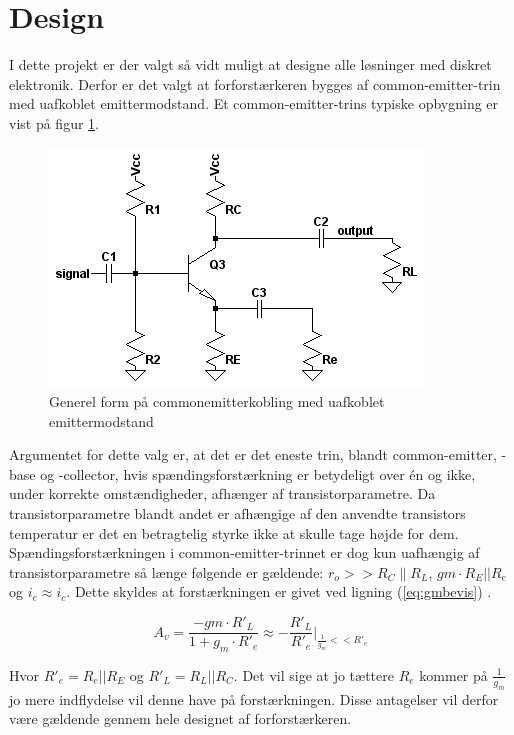 \section{Design}
I dette projekt er der valgt så vidt muligt at designe alle løsninger med diskret elektronik. Derfor er det valgt at forforstærkeren bygges af common-emitter-trin med uafkoblet emittermodstand. Et common-emitter-trins typiske opbygning er vist på figur \ref{fig:cekobling}.

\begin{figure}[h]
\centering
\includegraphics[scale=.6]{teknisk/forforstaerker/ceopkobling.png}
\caption{Generel form på commonemitterkobling med uafkoblet emittermodstand}
\label{fig:cekobling}
\end{figure}


Argumentet for dette valg er, at det er det eneste trin, blandt common-emitter, -base og -collector, hvis spændingsforstærkning er betydeligt over én og ikke, under korrekte omstændigheder, afhænger af transistorparametre. Da transistorparametre blandt andet er afhængige af den anvendte transistors temperatur er det en betragtelig styrke ikke at skulle tage højde for dem. Spændingsforstærkningen i common-emitter-trinnet er dog kun uafhængig af transistorparametre så længe følgende er gældende: $r_o >>R_C \| R_L$, $gm \cdot R_E||R_e$ og $i_e \approx i_c$.
Dette skyldes at forstærkningen er givet ved ligning (\ref{eq:gmbevis}) \cite{ael-mm6}.

\begin{equation}
A_v =  \frac{-gm \cdot R'_L}{1+g_m \cdot R'_e} \approx  -\frac{R'_L}{R'_e} \Biggr\vert _{\frac{1}{g_m}<<R'_e}
\label{eq:gmbevis}
\end{equation}

Hvor $R'_e = R_e || R_E$ og $R'_L = R_L||R_C$. Det vil sige at jo tættere $R_e$ kommer på $\frac{1}{g_m}$ jo mere indflydelse vil denne have på forstærkningen. Disse antagelser vil derfor være gældende gennem hele designet af forforstærkeren. 

